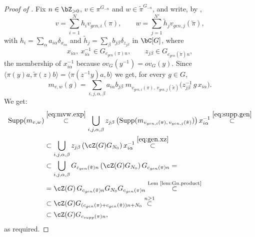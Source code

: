 \documentclass[12pt,a4paper]{amsart}%
\newcommand{\RamiA}[1]{{{#1}}}
\begin{document}
\begin{proof}[Proof of ]
Fix $n\in\Z_{>0}$, $v\in\pi^{G_{-n}}$ and $w\in\tilde\pi^{G_{-n}}$, and write, by
,
$$
v=\RamiA{\sum_{i=1}^N}h_iv_{gen,i}(\pi),\qquad w=\RamiA{\sum_{j=1}^{N'}}\tilde h_jv_{gen,j}(\tilde\pi),
$$
with $h_i=\sum_\alpha a_{i\alpha}\delta_{x_{i\alpha}}$ and
$\tilde h_j=\sum_\beta b_{j\beta}\delta_{z_{j\beta}}$ in $\C[G]$, where
\begin{equation}\label{eq:gen.xz}
x_{i\alpha},\ x_{i\alpha}^{-1}\in G_{c_{gen}(\pi)n},
\qquad z_{j\beta}\in G_{c_{gen}(\tilde\pi)n},
\end{equation}
the membership of $x_{i\alpha}^{-1}$ because $ov_G(y^{-1})=ov_G(y)$. Since
$\langle \pi(y)a,\tilde\pi(z)b\rangle=\langle\pi(z^{-1}y)a,b\rangle$ we get, for every $g\in G$,
\begin{equation}\label{eq:mvw.exp}
m_{v,w}(g)=\sum_{i,j,\alpha,\beta}a_{i\alpha}b_{j\beta}\;
m_{v_{gen,i}(\pi),\,v_{gen,j}(\tilde\pi)}\bigl(z_{j\beta}^{-1}\,g\,x_{i\alpha}\bigr) .
\end{equation}
\RamiA{
We get:
\begin{align*}
\supp(m_{v,w})
&\overset{\eqref{eq:mvw.exp}}{\subset}
\bigcup_{i,j,\alpha,\beta} z_{j\beta}
\left(\supp(m_{v_{gen,i}(\pi),\,v_{gen,j}(\tilde\pi)})\right)x_{i\alpha}^{-1}
\overset{\eqref{eq:supp.gen}}{\subset}\\
&\subset
\bigcup_{i,j,\alpha,\beta} z_{j\beta} \left(\cZ(G)G_{N_0}\right)x_{i\alpha}^{-1}
\overset{\eqref{eq:gen.xz}}{\subset}\\
&\subset
\bigcup_{i,j,\alpha,\beta} G_{c_{gen}(\tilde \pi)n} \left(\cZ(G)G_{N_0}\right)G_{c_{gen}(\pi)n}
=\\
&=\cZ(G)\,G_{c_{gen}(\tilde\pi)n}G_{N_0}G_{c_{gen}(\pi)n}
\overset{\text{Lem~\ref{lem:Gn.product}}}{\subset}\\
&\subset
\cZ(G)G_{(c_{gen}(\pi)+c_{gen}(\tilde\pi))n+N_0} \overset{n\geq 1}{\subset}\\
&\subset\cZ(G)G_{c_{supp}(\pi)n},
\end{align*}
as required.}

\end{proof}
\end{document}
